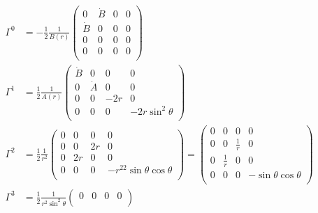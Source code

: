 \begin{subequations}
    \begin{align}
        \Gamma^0 & =
        -\frac{1}{2} \frac{1}{B(r)}
        \begin{pmatrix}
            0       & \dot{B} & 0 & 0 \\
            \dot{B} & 0       & 0 & 0 \\
            0       & 0       & 0 & 0 \\
            0       & 0       & 0 & 0 \\
        \end{pmatrix} \\
        \Gamma^1 & =
        \frac{1}{2} \frac{1}{A(r)}
        \begin{pmatrix}
            \dot{B} & 0       & 0   & 0               \\
            0        & \dot{A} & 0   & 0               \\
            0        & 0       & -2r & 0               \\
            0        & 0       & 0   & -2r\sin^2\theta \\
        \end{pmatrix} \\
        \Gamma^2 & =
        \frac{1}{2} \frac{1}{r^2}
        \begin{pmatrix}
            0 & 0  & 0  & 0                         \\
            0 & 0  & 2r & 0                         \\
            0 & 2r & 0  & 0                         \\
            0 & 0  & 0  & -r^22\sin\theta\cos\theta \\
        \end{pmatrix} =
        \begin{pmatrix}
            0 & 0           & 0           & 0                     \\
            0 & 0           & \frac{1}{r} & 0                     \\
            0 & \frac{1}{r} & 0           & 0                     \\
            0 & 0           & 0           & -\sin\theta\cos\theta \\
        \end{pmatrix} \\
        \Gamma^3 & =
        \frac{1}{2} \frac{1}{r^2\sin^2\theta}
        \begin{pmatrix}
            0 & 0              & 0                        & 0                        \\

\end{pmatrix}
\end{align}
\end{subequations}

